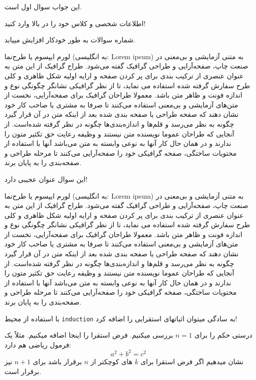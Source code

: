 \documentclass[11pt,largemargins]{homework}
\begin{document}
\maketitle

\question
  این جواب سوال اول است.

  اطلاعات شخصی و کلاس خود را در بالا وارد کنید!

\question
  شماره سوالات به طور خودکار افزایش مییابد.

  لورم ایپسوم یا طرح‌نما (به انگلیسی: Lorem ipsum) به متنی آزمایشی و بی‌معنی در صنعت چاپ، صفحه‌آرایی و طراحی گرافیک گفته می‌شود. طراح گرافیک از این متن به عنوان عنصری از ترکیب بندی برای پر کردن صفحه و ارایه اولیه شکل ظاهری و کلی طرح سفارش گرفته شده استفاده می نماید، تا از نظر گرافیکی نشانگر چگونگی نوع و اندازه فونت و ظاهر متن باشد. معمولا طراحان گرافیک برای صفحه‌آرایی، نخست از متن‌های آزمایشی و بی‌معنی استفاده می‌کنند تا صرفا به مشتری یا صاحب کار خود نشان دهند که صفحه طراحی یا صفحه بندی شده بعد از اینکه متن در آن قرار گیرد چگونه به نظر می‌رسد و قلم‌ها و اندازه‌بندی‌ها چگونه در نظر گرفته شده‌است. از آنجایی که طراحان عموما نویسنده متن نیستند و وظیفه رعایت حق تکثیر متون را ندارند و در همان حال کار آنها به نوعی وابسته به متن می‌باشد آنها با استفاده از محتویات ساختگی، صفحه گرافیکی خود را صفحه‌آرایی می‌کنند تا مرحله طراحی و صفحه‌بندی را به پایان برند.

  این سوال عنوان عجیبی دارد!

لورم ایپسوم یا طرح‌نما (به انگلیسی: Lorem ipsum) به متنی آزمایشی و بی‌معنی در صنعت چاپ، صفحه‌آرایی و طراحی گرافیک گفته می‌شود. طراح گرافیک از این متن به عنوان عنصری از ترکیب بندی برای پر کردن صفحه و ارایه اولیه شکل ظاهری و کلی طرح سفارش گرفته شده استفاده می نماید، تا از نظر گرافیکی نشانگر چگونگی نوع و اندازه فونت و ظاهر متن باشد. معمولا طراحان گرافیک برای صفحه‌آرایی، نخست از متن‌های آزمایشی و بی‌معنی استفاده می‌کنند تا صرفا به مشتری یا صاحب کار خود نشان دهند که صفحه طراحی یا صفحه بندی شده بعد از اینکه متن در آن قرار گیرد چگونه به نظر می‌رسد و قلم‌ها و اندازه‌بندی‌ها چگونه در نظر گرفته شده‌است. از آنجایی که طراحان عموما نویسنده متن نیستند و وظیفه رعایت حق تکثیر متون را ندارند و در همان حال کار آنها به نوعی وابسته به متن می‌باشد آنها با استفاده از محتویات ساختگی، صفحه گرافیکی خود را صفحه‌آرایی می‌کنند تا مرحله طراحی و صفحه‌بندی را به پایان برند.

\question
با استفاده از محیط  
   \texttt{induction} 
   به سادگی میتوان اثباتهای استقرایی را اضافه کرد!
  \begin{induction}
    \basecase
      درستی حکم را برای $n=1$ بررسی میکنیم. 
    \indhyp
     فرض استقرا را اینجا اضافه میکنیم. مثلاً یک فرمول ریاضی هم دارد:
      \[a^2 + b^2 = c^2\]
    \indstep
نشان میدهیم اگر فرض استقرا برای $k$ های کوچکتر از $n$ برقرار باشد برای $n+1$ نیز برقرار است.
  \end{induction}
\end{document}
